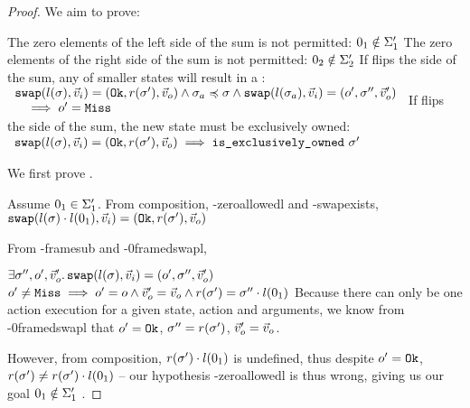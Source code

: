 \begin{proof}
We aim to prove:
\begin{goalvlist}
     The zero elements of the left side of the sum is not permitted: $0_1\notin \Sigma_1'$ 
     The zero elements of the right side of the sum is not permitted: $0_2\notin \Sigma_2'$ 
     If \swap{} flips the side of the sum, any \swap{} of smaller states will result in a \Miss: \\
    $\begin{array}{l}
    	\texttt{swap}(l(\sigma),\vec{v}_i)=(\texttt{Ok},r(\sigma'),\vec{v}_o)\land \sigma_a \preccurlyeq \sigma \land \texttt{swap}(l(\sigma_a),\vec{v}_i)=(o',\sigma'',\vec{v}_o') \\
    	\quad\implies o' = \texttt{Miss}
    \end{array}$
     If \swap{} flips the side of the sum, the new state must be exclusively owned:\\
    $\begin{array}{l}
    	\texttt{swap}(l(\sigma),\vec{v}_i)=(\texttt{Ok},r(\sigma'),\vec{v}_o) \implies \texttt{is\_exclusively\_owned}~\sigma'  
    \end{array}$
    
\end{goalvlist}



We first prove .

\begin{hypvlist}
	 Assume $0_1\in \Sigma_1'$.
	 From composition, \hyp{zeroallowedl} and \hyp{swapexists}, $\texttt{swap}(l(\sigma)\cdot l(0_1),\vec{v}_i)=(\texttt{Ok},r(\sigma'),\vec{v}_o)$ 
\end{hypvlist}

From \hyp{framesub} and \hyp{0framedswapl},
\begin{hypvlist}
	 $\exists \sigma'', o', \vec{v}_o'\ldotp \texttt{swap}(l(\sigma),\vec{v}_i)=(o', \sigma'', \vec{v}_o')$
	 $o' \neq \texttt{Miss} \implies o' = o \land  \vec{v}_o' = \vec{v}_o \land r(\sigma') = \sigma'' \cdot l(0_1)$
	 Because there can only be one action execution for a given state, action and arguments, we know from \hyp{0framedswapl} that $o'=\texttt{Ok}$, $\sigma''=r(\sigma')$, $\vec{v}_o'=\vec{v}_o$.
\end{hypvlist}

However, from composition, $r(\sigma')\cdot l(0_1)$ is undefined, thus despite $o'=\texttt{Ok}$, $r(\sigma')\neq r(\sigma')\cdot l(0_1)$ -- our hypothesis \hyp{zeroallowedl} is thus wrong, giving us our goal $0_1\notin \Sigma_1'$ .


\end{proof}
